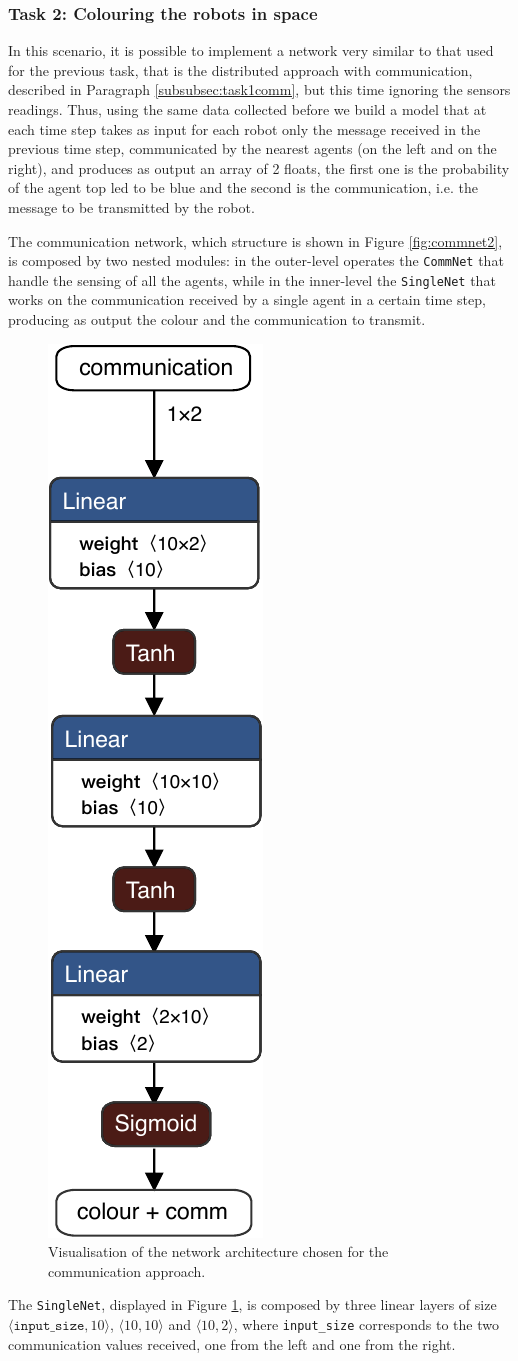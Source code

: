 \subsubsection{Task 2: Colouring the robots in space}
In this scenario, it is possible to implement a network very similar to that used for 
the previous task, that is the distributed approach with communication, described 
in Paragraph \ref{subsubsec:task1comm}, but this time ignoring the sensors 
readings.
Thus, using the same data collected before we build a model that at each time 
step takes as input for each robot only the message received in the previous time 
step, communicated by the nearest agents (on the left and on the right), and 
produces as output an array of 2 floats, the first one is the probability of the agent 
top \gls{led} to be blue and the second is the communication, i.e. the message to 
be transmitted by the robot.

The communication network, which structure is shown in Figure 
\ref{fig:commnet2}, is composed by two nested modules: in the outer-level 
operates the \texttt{CommNet} that handle the sensing of all the agents, while in 
the inner-level the \texttt{SingleNet} that works on the communication received 
by a single agent in a certain time step, producing as output the colour and the 
communication to transmit. 
\begin{figure}[H]
	\centering
	\includegraphics[width=.14\textwidth]{contents/images/task2allcomm}
	\caption[Network architectures for the communication approach.]{Visualisation 
		of the network architecture chosen for the 
		communication approach.}
	\label{fig:singlenetcomm2}
\end{figure}

The \texttt{SingleNet}, displayed in Figure \ref{fig:singlenetcomm2}, is composed 
by three linear layers of size $\langle \mathtt{input\_size}, 10\rangle$,  $\langle 
10, 10\rangle$ and $\langle 10, 2\rangle$, where \texttt{input\_size} 
corresponds to the two communication values received, one from the left and one 
from the right.



